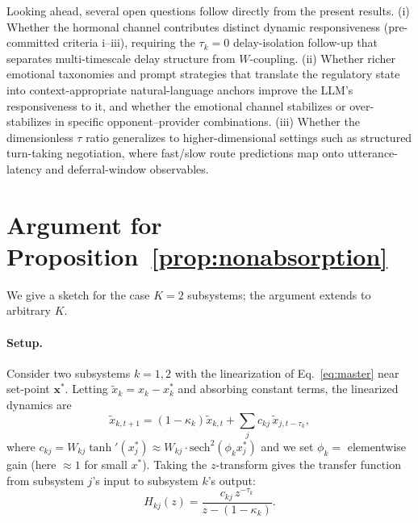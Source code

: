 \documentclass{article}
\begin{document}
Looking ahead, several open questions follow directly from the present results. (i) Whether the hormonal channel contributes distinct dynamic responsiveness (pre-committed criteria i--iii), requiring the $\tau_k{=}0$ delay-isolation follow-up that separates multi-timescale delay structure from $W$-coupling. (ii) Whether richer emotional taxonomies and prompt strategies that translate the regulatory state into context-appropriate natural-language anchors improve the LLM's responsiveness to it, and whether the emotional channel stabilizes or over-stabilizes in specific opponent--provider combinations. (iii) Whether the dimensionless $\tau$ ratio generalizes to higher-dimensional settings such as structured turn-taking negotiation, where fast/slow route predictions map onto utterance-latency and deferral-window observables.




\newpage
\appendix
\section{Argument for Proposition~\ref{prop:nonabsorption}}\label{app:proof}

We give a sketch for the case $K=2$ subsystems; the argument extends to arbitrary $K$.

\paragraph{Setup.} Consider two subsystems $k=1,2$ with the linearization of Eq.~\eqref{eq:master} near set-point $\mathbf{x}^*$. Letting $\tilde x_k = x_k - x^*_k$ and absorbing constant terms, the linearized dynamics are
\[
\tilde x_{k,t+1} = (1-\kappa_k)\tilde x_{k,t} + \sum_{j} c_{kj}\,\tilde x_{j,t-\tau_k},
\]
where $c_{kj} = W_{kj}\tanh'(x^*_j) \approx W_{kj}\cdot\mathrm{sech}^2(\phi_k x^*_j)$ and we set $\phi_k = $ elementwise gain (here $\approx 1$ for small $x^*$). Taking the $z$-transform gives the transfer function from subsystem $j$'s input to subsystem $k$'s output:
\[
H_{kj}(z) = \frac{c_{kj}\, z^{-\tau_k}}{z - (1-\kappa_k)}.
\]
\end{document}
